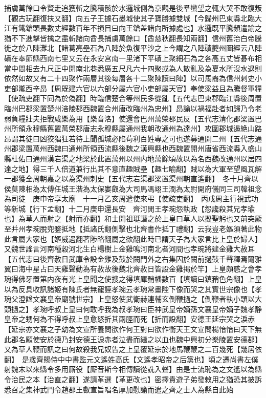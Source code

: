 捕虜萬餘口令賢走追獲斬之騰積骸於水邏城側為京觀是後羣蠻望之輒大哭不敢復叛【觀古玩翻復扶又翻】向五子王據石墨城使其子寶勝據雙城【今歸州巴東縣北臨大江有鐵鎗頭長數丈經數百年不損目曰向王鎗盖諸向所據處也】水邏既平騰頻遣諭之猶不下進擊皆擒之盡斬諸向酋長捕虜萬餘口【酋慈秋翻長知兩翻】信州舊治白帝騰徙之於八陳灘北【諸葛亮壘石為八陣於魚復平沙之上今謂之八陣磧夔州圖經云八陣磧在奉節縣西南七里又云在永安宫南一里渚下平磧上聚細石為之各高五丈皆碁布相當中間相去九尺正中開南北巷悉廣五尺凡六十四聚或為人散亂及為夏水所沒水退則依然如故又有二十四聚作兩層其後每層各十二聚陳讀曰陣】以司馬裔為信州刺史小吏部隴西辛昂【周既建六官以六部分屬六官小吏部屬天官】奉使梁益且為騰督軍糧【使疏吏翻下同為於偽翻】時臨信楚合等州民多從亂【五代志巴東郡臨江縣後周置臨州巴郡梁置楚州涪陵郡西魏置合州唐改臨州為忠州】昂諭以禍福赴者如歸乃令老弱負糧壯夫拒戰咸樂為用【樂音洛】使還會巴州萬榮郡民反【五代志清化郡梁置巴州所領永穆縣舊置萬榮郡唐志永穆縣屬通州我朝改通州為達州】攻圍郡城遏絶山路昂謂其徒曰凶狡猖狂若待上聞孤城必陷苟利百姓專之可也遂募通開二州【五代志通州郡梁置萬州西魏曰通州所領西流縣後魏之漢興縣也西魏置開州唐省西流縣入盛山縣杜佑曰通州漢宕渠之地梁於此置萬州以州内地萬餘頃故以為名西魏改通州以居四達之地】得三千人倍道兼行出其不意直趣賊壘【趣七喻翻】賊以為大軍至望風瓦解一郡獲全周朝嘉之以為渠州刺史【五代志宕渠郡梁置渠州朝直遙翻】　冬十月齊以侯莫陳相為太傅任城王湝為太保婁叡為大司馬馮翊王潤為太尉開府儀同三司韓祖念為司徒　庚申帝享太廟　十一月乙亥周遣使來弔【使疏吏翻】　丙戌周主行視武功等新城【行下孟翻】十二月庚申還長安　齊河閒王孝琬怨執政【怨讒殺其兄孝瑜也】為草人而射之【射而亦翻】和士開祖珽譛之於上皇曰草人以擬聖躬也又前突厥至并州孝琬脫兜鍪抵地【抵諸氏翻側擊也北齊書作抵丁禮翻】云我豈老嫗須著此物此言屬大家也【嫗威遇翻著陟略翻屬之欲翻此時已謂天子為大家言比上皇於婦人】又魏世謠言河南種穀河北生白楊樹上金雞鳴河南北者河間也孝琬將建金雞大赦耳【五代志曰後齊赦日武庫令設金雞及鼓於闕門外之右集囚於闕前撾鼔千聲釋焉爾雅翼曰海中星占曰天雞聲動為有赦故後魏北齊赦日皆設金雞掲於竿】上皇頗惑之會孝琬得佛牙置第内夜有光上皇聞之使搜之得填庫矟幡數百【填讀曰鎮矟色角翻】上皇以為反具收訊諸姬有陳氏者無寵誣孝琬云孝琬常畫陛下像而哭之其實世宗像也【孝琬父澄諡文襄皇帝廟號世宗】上皇怒使武衛赫連輔玄倒鞭撾之【倒鞭者執小頭以大頭撾之】孝琬呼叔上皇曰何敢呼我為叔孝琬曰臣神武皇帝嫡孫文襄皇帝嫡子魏孝静皇帝之甥何為不得呼叔上皇愈怒折其兩脛而死【折而設翻】安德王延宗哭之淚赤【延宗亦文襄之子幼為文宣所養問欲作何王對曰欲作衝天王文宣問楊愔愔曰天下無此郡名願使安於德乃封安德王淚赤者泣盡而繼之以血也魏中興初分樂陵置安德郡】又為草人鞭而訊之曰何故殺我兄奴告之上皇覆延宗於地馬鞭鞭之二百幾死【幾居依翻】　是歲齊賜侍中中書監元文遙姓高氏【文遙孝昭帝之后黨也】頃之遷尚書左僕射魏末以來縣令多用厮役【厮音斯今相傳讀從詵入聲】由是士流恥為之文遙以為縣令治民之本【治直之翻】遂請革選【革更改也】密擇貴遊子弟發敕用之猶恐其披訴悉召之集神武門令趙郡王叡宣旨唱名厚加慰諭而遣之齊之士人為縣自此始

